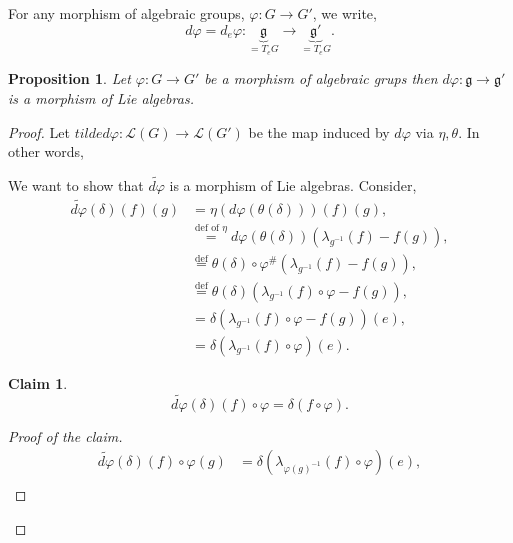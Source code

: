 \documentclass[10pt]{article}
\newtheorem{proposition}{Proposition}[section]
\newtheorem{claim}{Claim}[proposition]
\numberwithin{equation}{theorem}
\newcommand{\Lie}[0]{\mathcal{L}}
\newcommand{\g}[0]{\mathfrak{g}}
\begin{document}
For any morphism of algebraic groups, $\varphi:G\to G'$, we write,
\begin{equation*}
  d\varphi = d_e\varphi:\underbrace{\g}_{=T_eG}\to\underbrace{\g'}_{=T_eG}.
\end{equation*}

\begin{proposition}
  \label{proposition_5_16}
  Let $\varphi:G\to G'$ be a morphism of algebraic grups then $d\varphi:\g\to\g'$ is a morphism of Lie algebras.
\end{proposition}

\begin{proof}
  Let $tilde{d\varphi}:\Lie(G)\to\Lie(G')$ be the map induced by $d\varphi$ via $\eta,\theta$. In other words, 
  \begin{center}
  \end{center}
  We want to show that $\tilde{d\varphi}$ is a morphism of Lie algebras. Consider,
  \begin{align*}
    \tilde{d\varphi}(\delta)(f)(g) & = \eta(d\varphi(\theta(\delta)))(f)(g),\\
    & \stackrel{\text{def of $\eta$}}{=} d\varphi(\theta(\delta))(\lambda_{g^{-1}}(f)-f(g)),\\
    &\stackrel{\text{def}}{=}\theta(\delta)\circ\varphi^\#(\lambda_{g^{-1}}(f)-f(g)),\\
&\stackrel{\text{def}}{=}\theta(\delta)(\lambda_{g^{-1}}(f)\circ\varphi-f(g)),\\
&=\delta(\lambda_{g^{-1}}(f)\circ\varphi-f(g))(e),\\
& = \delta(\lambda_{g^{-1}}(f)\circ\varphi)(e).
  \end{align*}
  \begin{claim}
  \begin{equation*}
    \tilde{d\varphi}(\delta)(f)\circ\varphi = \delta(f\circ \varphi).
  \end{equation*}
  \end{claim} 
  \begin{proof}[Proof of the claim]
    \begin{align*}
      \tilde{d\varphi}(\delta)(f)\circ\varphi(g)&=\delta(\lambda_{\varphi(g)^{-1}}(f)\circ\varphi)(e),\\

\end{align*}
\end{proof}
\end{proof}
\end{document}
